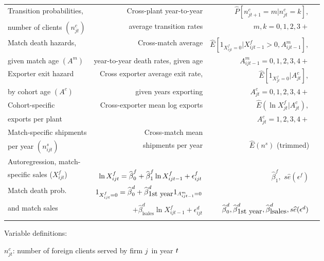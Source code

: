 \documentclass[12pt,titlepage]{article}
\begin{document}
\begin{table}[tbp]
{\begin{tabular}{lrrr}
Transition probabilities, & Cross-plant year-to-year & $\widehat{P}%
[n_{jt+1}^{c}=m|n_{jt}^{c}=k],$ \\ 
number of clients $(n_{jt}^{c})$ & average transition rates & $m,k=0,1,2,3+$
\\ \noalign{\smallskip} \hline \noalign{\smallskip}
Match death hazards, & Cross-match average & $\widehat{E}%
[1_{X_{ijt}^{f}=0}|X_{ijt-1}^{f}>0,A_{ijt-1}^{m}],$ \\ 
given match age $(A^{m})$ & year-to-year death rates, given age & $%
A_{ijt-1}^{m}=0,1,2,3,4+$ \\ \noalign{\smallskip} \hline \noalign{\smallskip}
Exporter exit hazard & Cross exporter average exit rate, & $\widehat{E}%
[1_{X_{jt}^{f}=0}|A_{jt}^{c}],$ \\ 
by cohort age $(A^{c})$ & given years exporting & $A_{jt}^{c}=0,1,2,3,4+$ \\ \noalign{\smallskip} \hline \noalign{\smallskip}
Cohort-specific & Cross-exporter mean log exports & $\widehat{E}(\ln
X_{jt}^{f}|A_{jt}^{c}),$ \\ 
exports per plant &  & $A_{jt}^{c}=1,2,3,4+$ \\ \noalign{\smallskip} \hline \noalign{\smallskip}
Match-specific shipments & Cross-match mean &  \\ 
per year $(n_{ijt}^{s})$ & shipments per year & $\widehat{E}\left(n^{s}\right) $ (trimmed) \\ \noalign{\smallskip} \hline \noalign{\smallskip}
Autoregression, match- &  & \\
specific sales ($X_{ijt}^{f}$) & $\ln X_{ijt}^{f}=\widehat{\beta }_{0}^{f}+\widehat{%
\beta }_{1}^{f}\ln X_{ijt-1}^{f}+\epsilon _{ijt}^{f}$ & $\widehat{\beta }_{1}^{f},$ $s\widehat{e}(\epsilon ^{f})$ \\ \noalign{\smallskip} \hline \noalign{\smallskip}
Match death prob. & $1_{X_{ijt}^{f}=0}=\widehat{\beta }_{0}^{d}+\widehat{%
\beta }_{\mbox{1st year}}^{d}1_{A_{ijt-1}^{m}=0}$ &  \\ \noalign{\smallskip}
and match sales & $+\widehat{\beta }_{\mbox{lsales}}^{d}\ln
X_{ijt-1}^{f}+\epsilon _{ijt}^{d}$ & $\widehat{\beta }_{0}^{d},\widehat{\beta }_{\mbox{1st year}}^{d},\widehat{\beta }_{%
\mbox{lsales}}^{d},s\widehat{e}(\epsilon ^{d})$ \\ \noalign{\smallskip} \hline \noalign{\smallskip}
\end{tabular}%
\newline\flushleft\small{\small Variable definitions: }

$n_{jt}^{c}${\small : number of foreign clients served by firm }$j${\small \ in year }${\small t}${\small \ }

}
\end{table}
\end{document}
